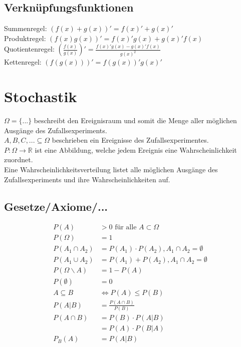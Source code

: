 \documentclass[a4paper, landscape, 10pt]{article}
\begin{document}
\begin{multicols}{4}
\begin{small}
		\subsection{Verknüpfungsfunktionen}
			Summenregel: $(f(x) + g(x))' = f(x)' + g(x)' $ \\ 
			Produktregel: $(f(x)g(x))' = f(x)'g(x)+g(x)'f(x) $ \\
			Quotientenregel: $(\frac{f(x)}{g(x)})' = \frac{f(x)'g(x)-g(x)'f(x)}{g(x)^2}$ \\
			Kettenregel: $(f(g(x)))' = f(g(x))'g(x)'$ \\
    \section{Stochastik}
    	$\Omega = \{ ... \}$ beschreibt den Ereignisraum und somit die Menge aller möglichen Ausgänge des Zufallsexperiments.\\
    	$A, B, C, ... \subseteq \Omega$ beschrieben ein Ereignisse des Zufallsexperimentes.\\
    	$P: \Omega \rightarrow \mathbb{R}$ ist eine Abbildung, welche jedem Ereignis eine Wahrscheinlichkeit zuordnet.\\
    	Eine Wahrscheinlichkeitsverteilung listet alle möglichen Ausgänge des Zufallsexperiments und ihre Wahrscheinlichkeiten auf.
    	\subsection{Gesetze/Axiome/...}
	    	\begin{align*}
	    	P(A) &> 0 \text{ für alle } A \subset \Omega\\
	    	P(\Omega) &= 1\\
	    	P(A_1 \cap A_2) &= P(A_1) \cdot P(A_2), A_1 \cap A_2 = \emptyset \\
	    	P(A_1 \cup A_2) &= P(A_1) + P(A_2), A_1 \cap A_2 = \emptyset \\
	    	P(\Omega \backslash A) &= 1 - P(A)\\
	    	P(\emptyset) &= 0\\
	    	A \subseteq B &\iff P(A) \leq P(B) \\
	    	P(A|B) &= \frac{P(A \cap B)}{P(B)} \\
	    	P(A\cap B) &= P(B) \cdot P(A|B)\\
	    	&= P(A) \cdot P(B|A)\\
	    	P_B(A) &= P(A|B)
	    	\end{align*}
	    

\end{small}
\end{multicols}
\end{document}
